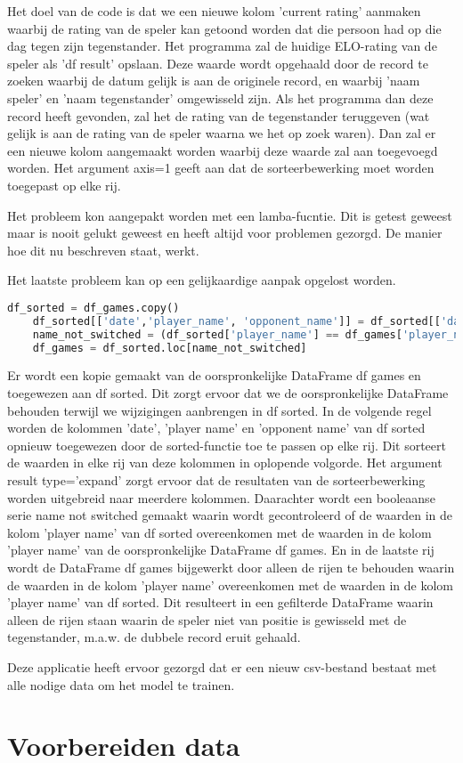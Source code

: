 Het doel van de code is dat we een nieuwe kolom 'current rating' aanmaken waarbij de rating van de speler kan getoond worden dat die persoon had op die dag tegen zijn tegenstander. Het programma zal de huidige ELO-rating van de speler als 'df result' opslaan. Deze waarde wordt opgehaald door de record te zoeken waarbij de datum gelijk is aan de originele record, en waarbij 'naam speler' en 'naam tegenstander' omgewisseld zijn. Als het programma dan deze record heeft gevonden, zal het de rating van de tegenstander teruggeven (wat gelijk is aan de rating van de speler waarna we het op zoek waren). Dan zal er een nieuwe kolom aangemaakt worden waarbij deze waarde zal aan toegevoegd worden. Het argument axis=1 geeft aan dat de sorteerbewerking moet worden toegepast op elke rij. 

Het probleem kon aangepakt worden met een lamba-fucntie. Dit is getest geweest maar is nooit gelukt geweest en heeft altijd voor problemen gezorgd. De manier hoe dit nu beschreven staat, werkt.

Het laatste probleem kan op een gelijkaardige aanpak opgelost worden.

\begin{lstlisting}[language=Python]
    df_sorted = df_games.copy()
    df_sorted[['date','player_name', 'opponent_name']] = df_sorted[['date','player_name', 'opponent_name']].apply(sorted, axis=1, result_type='expand')
    name_not_switched = (df_sorted['player_name'] == df_games['player_name'])
    df_games = df_sorted.loc[name_not_switched]
\end{lstlisting}

Er wordt een kopie gemaakt van de oorspronkelijke DataFrame df games en toegewezen aan df sorted. Dit zorgt ervoor dat we de oorspronkelijke DataFrame behouden terwijl we wijzigingen aanbrengen in df sorted. In de volgende regel worden de kolommen 'date', 'player name' en 'opponent name' van df sorted opnieuw toegewezen door de sorted-functie toe te passen op elke rij. Dit sorteert de waarden in elke rij van deze kolommen in oplopende volgorde. Het argument result type='expand' zorgt ervoor dat de resultaten van de sorteerbewerking worden uitgebreid naar meerdere kolommen. Daarachter wordt een booleaanse serie name not switched gemaakt waarin wordt gecontroleerd of de waarden in de kolom 'player name' van df sorted overeenkomen met de waarden in de kolom 'player name' van de oorspronkelijke DataFrame df games. En in de laatste rij wordt de DataFrame df games  bijgewerkt door alleen de rijen te behouden waarin de waarden in de kolom 'player name' overeenkomen met de waarden in de kolom 'player name' van df sorted. Dit resulteert in een gefilterde DataFrame waarin alleen de rijen staan waarin de speler niet van positie is gewisseld met de tegenstander, m.a.w. de dubbele record eruit gehaald.

Deze applicatie heeft ervoor gezorgd dat er een nieuw csv-bestand bestaat met alle nodige data om het model te trainen.

\section{Voorbereiden data}

